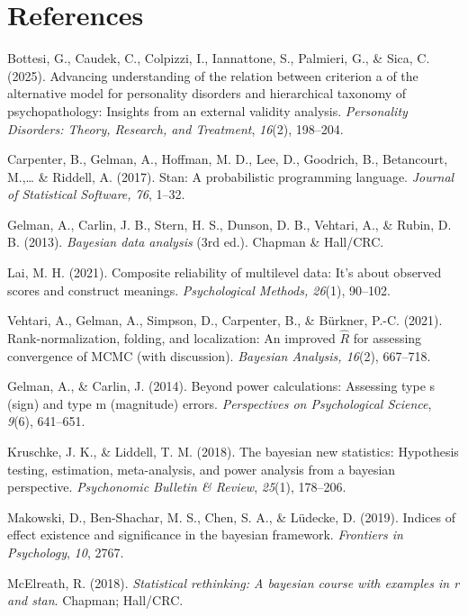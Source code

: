 \documentclass[
  english,
  man,floatsintext]{apa6}
\newlength{\cslhangindent}
\newenvironment{CSLReferences}[2] %
 {\begin{list}{}{%
  \setlength{\itemindent}{0pt}
  \setlength{\leftmargin}{0pt}
  \setlength{\parsep}{0pt}
  \ifodd #1
   \setlength{\leftmargin}{\cslhangindent}
   \setlength{\itemindent}{-1\cslhangindent}
  \fi
  \setlength{\itemsep}{#2\baselineskip}}}
 {\end{list}}
\begin{document}
\FloatBarrier

\newpage

\section{References}\label{references}

Bottesi, G., Caudek, C., Colpizzi, I., Iannattone, S., Palmieri, G., \& Sica, C. (2025). Advancing understanding of the relation between criterion a of the alternative model for personality disorders and hierarchical taxonomy of psychopathology: Insights from an external validity analysis. \emph{Personality Disorders: Theory, Research, and Treatment}, \emph{16}(2), 198--204.

Carpenter, B., Gelman, A., Hoffman, M. D., Lee, D., Goodrich, B., Betancourt, M.,\ldots{} \& Riddell, A. (2017). Stan: A probabilistic programming language. \emph{Journal of Statistical Software, 76}, 1--32.

Gelman, A., Carlin, J. B., Stern, H. S., Dunson, D. B., Vehtari, A., \& Rubin, D. B. (2013). \emph{Bayesian data analysis} (3rd ed.). Chapman \& Hall/CRC.

Lai, M. H. (2021). Composite reliability of multilevel data: It's about observed scores and construct meanings. \emph{Psychological Methods, 26}(1), 90--102.

Vehtari, A., Gelman, A., Simpson, D., Carpenter, B., \& Bürkner, P.-C. (2021). Rank-normalization, folding, and localization: An improved \(\hat{R}\) for assessing convergence of MCMC (with discussion). \emph{Bayesian Analysis, 16}(2), 667--718.

\protect{}\label{refs}
\begin{CSLReferences}{1}{0}
Gelman, A., \& Carlin, J. (2014). Beyond power calculations: Assessing type s (sign) and type m (magnitude) errors. \emph{Perspectives on Psychological Science}, \emph{9}(6), 641--651.

Kruschke, J. K., \& Liddell, T. M. (2018). The bayesian new statistics: Hypothesis testing, estimation, meta-analysis, and power analysis from a bayesian perspective. \emph{Psychonomic Bulletin \& Review}, \emph{25}(1), 178--206.

Makowski, D., Ben-Shachar, M. S., Chen, S. A., \& Lüdecke, D. (2019). Indices of effect existence and significance in the bayesian framework. \emph{Frontiers in Psychology}, \emph{10}, 2767.

McElreath, R. (2018). \emph{Statistical rethinking: A bayesian course with examples in r and stan}. Chapman; Hall/CRC.

\end{CSLReferences}
\end{document}
